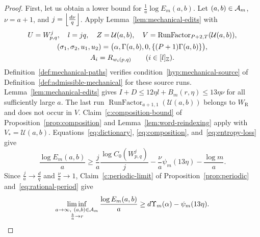 \begin{proof}
First, let us obtain a lower bound for $\frac1a\log E_m(a,b)$.
Let $(a,b)\in\mathcal A_m$, $\nu=a+1$, and $j=\left\lfloor\frac{d\nu}{q}\right\rfloor$.
Apply Lemma~\ref{lem:mechanical-edits} with
\[
\begin{gathered}
 U=W_{p,q}^j,\quad l=jq,\quad Z=\mathcal U(a,b),\quad
 V=\operatorname{RunFactor}_{P+2,T}(\mathcal U(a,b)),\\
 (\sigma_1,\sigma_2,u_1,u_2)
 =\bigl(\alpha,\Gamma(a,b),0,\{(P+1)\Gamma(a,b)\}\bigr),\\
 A_i=R_{w_i(p,q)}\qquad(i\in[l]_{\mathbb Z}).
\end{gathered}
\]
Definition~\ref{def:mechanical-paths} verifies condition~\ref{hyp:mechanical-source} of Definition~\ref{def:admissible-mechanical} for these source runs.
Lemma~\ref{lem:mechanical-edits} gives $I+D\le12\eta l+B_m(r,\eta)\le13\eta\nu$
for all sufficiently large $a$.
The last run $\operatorname{RunFactor}_{a+1,1}(\mathcal U(a,b))$
belongs to $W_{\mathrm R}$ and does not occur in $V$.
Claim~\ref{c:composition-bound} of Proposition~\ref{prop:composition}
and Lemma~\ref{lem:word-reindexing} apply with $V_*=\mathcal U(a,b)$.
Equations~\eqref{eq:dictionary}, \eqref{eq:composition}, and~\eqref{eq:entropy-loss} give
\[
 \frac{\log E_m(a,b)}a
 \ge\frac{j}{a}\frac{\log C_0(W_{p,q}^j)}j
 -\frac{\nu}{a}\psi_m(13\eta)-\frac{\log m}{a}.
\]
Since $\frac ja\to\frac dq$ and $\frac\nu a\to1$, Claim~\ref{c:periodic-limit} of Proposition~\ref{prop:periodic} and~\eqref{eq:rational-period} give
\begin{equation}\label{eq:irrational-lower}
 \liminf_{\substack{a\to\infty,\ (a,b)\in\mathcal A_m\\\frac{b}{a}\to r}}
 \frac{\log E_m(a,b)}a
 \ge d\Upsilon_m(\alpha)-\psi_m(13\eta).
\end{equation}


\end{proof}
